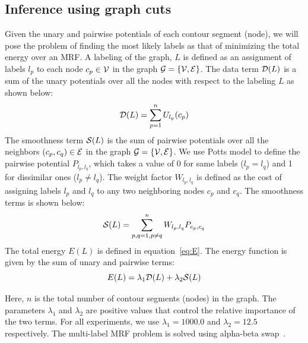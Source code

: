 \subsection{Inference using graph cuts}

Given the unary and pairwise potentials of each contour segment (node), we will pose the problem
of finding the most likely labels as that of minimizing the total energy over an MRF. A labeling
of the graph, $L$ is defined as an assignment of labels $l_p$ to each node $c_p \in {\cal V}$ in 
the graph ${\cal G}=\{{\cal V},{\cal E}\}$. The data term ${\cal D}(L)$ is a sum
of the unary potentials over all the nodes with respect to the labeling $L$ as shown below:
\begin{equation}
   {\cal D}(L) = \sum_{p=1}^{n} U_{l_p}(c_p)
\end{equation}
The smoothness term ${\cal S}(L)$ is the sum of pairwise potentials over all the neighbors 
$(c_p,c_q) \in {\cal E}$ in the graph ${\cal G}=\{{\cal V},{\cal E}\}$. We use Potts model to define 
the pairwise potential $P_{l_p,l_q}$, which takes a value of 0 for same labels ($l_p=l_q$) and 1 for 
dissimilar ones ($l_p \ne l_q$). The weight factor $W_{l_p,l_q}$ is defined as the cost of assigning 
labels $l_p$ and $l_q$ to any two neighboring nodes $c_p$ and $c_q$. The smoothness terms is shown below:
\begin{equation}
   {\cal S}(L) = \sum_{p,q=1, p \neq q}^{n} W_{l_p,l_q} P_{c_p,c_q}
   \label{eq:datasmooth}
\end{equation}
The total energy $E(L)$ is defined in equation~\ref{eq:E}. The energy function is given by the sum of unary 
and pairwise terms:
\begin{equation}
   \label{eq:E}
   E(L) = \lambda_1  {\cal D}(L) + \lambda_2  {\cal S}(L)
\end{equation}
	
Here, $n$ is the total number of contour segments (nodes) in the graph. The parameters $\lambda_1$ 
and $\lambda_2$ are positive values that control the relative importance of the two terms. For all 
experiments, we use $\lambda_1=1000.0$ and $\lambda_2=12.5$ respectively. The multi-label MRF 
problem is solved using alpha-beta swap~\cite{boykov2001fast}.